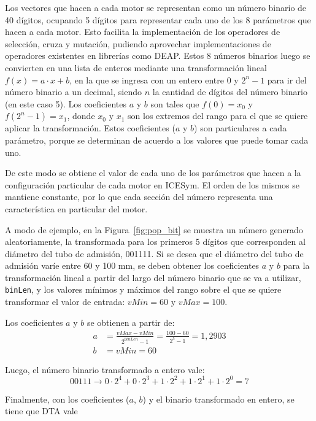 Los vectores que hacen a cada motor se representan como un número binario de 40
dígitos, ocupando 5 dígitos para representar cada uno de los 8 parámetros que
hacen a cada motor.
%
Esto facilita la implementación de los operadores de selección, cruza y
mutación, pudiendo aprovechar implementaciones de operadores existentes en
librerías como DEAP.
%
Estos 8 números binarios luego se convierten en una lista de enteros mediante
una transformación lineal $f(x)=a\cdot x+b$, en la que se ingresa con un entero
entre 0 y $2^{n}-1$ para ir del número binario a un decimal, siendo $n$ la
cantidad de dígitos del número binario (en este caso 5).
%
Los coeficientes $a$ y $b$ son tales que $f(0)=x_{0}$ y $f(2^{n}-1) = x_{1}$,
donde $x_{0}$ y $x_{1}$ son los extremos del rango para el que se quiere aplicar
la transformación.
%
Estos coeficientes ($a$ y $b$) son particulares a cada parámetro, porque se
determinan de acuerdo a los valores que puede tomar cada uno.

De este modo se obtiene el valor de cada uno de los parámetros que hacen a la
configuración particular de cada motor en ICESym.
%
El orden de los mismos se mantiene constante, por lo que cada sección del número
representa una característica en particular del motor.

A modo de ejemplo, en la Figura~\ref{fig:pop_bit} se muestra un número generado
aleatoriamente, la transformada para los primeros 5 dígitos que corresponden al
diámetro del tubo de admisión, 001111.
%
Si se desea que el diámetro del tubo de admisión varíe entre 60 y 100 mm, se
deben obtener los coeficientes $a$ y $b$ para la transformación lineal  a partir
del largo del número binario que se va a utilizar, {\tt{binLen}}, y los valores
mínimos y máximos del rango sobre el que se quiere transformar el valor de
entrada: $vMin=60$ y $vMax=100$.

Los coeficientes $a$ y $b$ se obtienen a partir de:
\begin{align*}
  a &= \frac{vMax-vMin}{2^{binLen} - 1} =\frac{100-60}{2^{5}-1} = 1,2903\\
  b &= vMin=60
\end{align*}

Luego, el número binario transformado a entero vale:
\begin{equation*}
  00111 \longrightarrow 0\cdot 2^{4} + 0\cdot 2^{3} + 1\cdot 2^{2} + 1\cdot 2^{1} + 1\cdot 2^{0} = 7
\end{equation*}

Finalmente, con los coeficientes ($a$, $b$) y el binario transformado en entero,
se tiene que DTA vale


